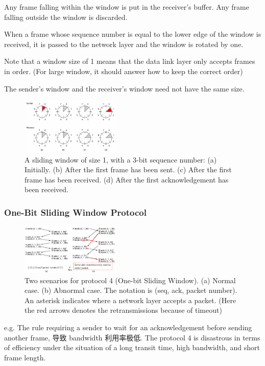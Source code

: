 Any frame falling within the window is put in the receiver's buffer. Any frame falling outside the window is discarded.

When a frame whose sequence number is equal to the lower edge of the window is received, it is passed to the network layer and the window is rotated by one.

Note that a window size of 1 means that the data link layer only accepts frames in order. (For large window, it should answer how to keep the correct order)

The sender’s window and the receiver’s window need not have the same size. 

\begin{figure}[!htb]
    \centering
    \includegraphics[width=0.42\textwidth]{pic/CN3/Sliding Window Protocols}
    \caption{A sliding window of size 1, with a 3-bit sequence number: (a) Initially. (b) After the first frame has been sent. (c) After the first frame has been received. (d) After the first acknowledgement has been received.}
\end{figure}

\subsubsection{One-Bit Sliding Window Protocol}%
\begin{figure}[!htb]
    \centering
    \includegraphics[width=0.42\textwidth]{pic/CN3/One-Bit Sliding Window Protocol}
    \caption{Two scenarios for protocol 4 (One-bit Sliding Window). (a) Normal case. (b) Abnormal case. The notation is (seq, ack, packet number). An asterisk indicates where a network layer accepts a packet. (Here the red arrows denotes the retransmissions because of timeout)}
\end{figure}

e.g. The rule requiring a sender to wait for an acknowledgement before sending another frame, 导致 bandwidth 利用率极低. The protocol 4 is disastrous in terms of efficiency under the situation of a long transit time, high bandwidth, and short frame length.

